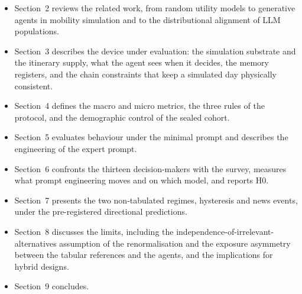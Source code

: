 \begin{itemize}
  \item Section~2 reviews the related work, from random utility models to generative agents in mobility simulation and to the distributional alignment of LLM populations.
  \item Section~3 describes the device under evaluation: the simulation substrate and the itinerary supply, what the agent sees when it decides, the memory registers, and the chain constraints that keep a simulated day physically consistent.
  \item Section~4 defines the macro and micro metrics, the three rules of the protocol, and the demographic control of the sealed cohort.
  \item Section~5 evaluates behaviour under the minimal prompt and describes the engineering of the expert prompt.
  \item Section~6 confronts the thirteen decision-makers with the survey, measures what prompt engineering moves and on which model, and reports H0.
  \item Section~7 presents the two non-tabulated regimes, hysteresis and news events, under the pre-registered directional predictions.
  \item Section~8 discusses the limits, including the independence-of-irrelevant-alternatives assumption of the renormalisation and the exposure asymmetry between the tabular references and the agents, and the implications for hybrid designs.
  \item Section~9 concludes.
\end{itemize}
